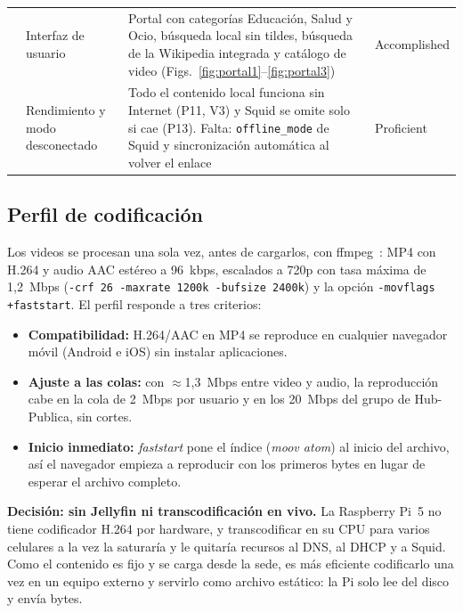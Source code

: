 \documentclass[conference]{IEEEtran}
\begin{document}
\begin{table}[!t]
\begin{tabularx}{\textwidth}{lP{2.5cm}YP{1.7cm}}
 & Interfaz de usuario & Portal con categorías Educación, Salud y Ocio, búsqueda local sin tildes, búsqueda de la Wikipedia integrada y catálogo de video (Figs.~\ref{fig:portal1}--\ref{fig:portal3}) & Accomplished \\
 & Rendimiento y modo desconectado & Todo el contenido local funciona sin Internet (P11, V3) y Squid se omite solo si cae (P13). Falta: \texttt{offline\_mode} de Squid y sincronización automática al volver el enlace & Proficient \\
\bottomrule
\end{tabularx}
\end{table}

\subsection{Perfil de codificación}
Los videos se procesan una sola vez, antes de cargarlos, con ffmpeg~\cite{ffmpeg}: MP4 con H.264 y audio AAC estéreo a 96~kbps, escalados a 720p con tasa máxima de 1,2~Mbps (\texttt{-crf 26 -maxrate 1200k -bufsize 2400k}) y la opción \texttt{-movflags +faststart}. El perfil responde a tres criterios:
\begin{itemize}
\item \textbf{Compatibilidad:} H.264/AAC en MP4 se reproduce en cualquier navegador móvil (Android e iOS) sin instalar aplicaciones.
\item \textbf{Ajuste a las colas:} con $\approx$1,3~Mbps entre video y audio, la reproducción cabe en la cola de 2~Mbps por usuario y en los 20~Mbps del grupo de Hub-Publica, sin cortes.
\item \textbf{Inicio inmediato:} \textit{faststart} pone el índice (\textit{moov atom}) al inicio del archivo, así el navegador empieza a reproducir con los primeros bytes en lugar de esperar el archivo completo.
\end{itemize}

\textbf{Decisión: sin Jellyfin ni transcodificación en vivo.} La Raspberry Pi~5 no tiene codificador H.264 por hardware, y transcodificar en su CPU para varios celulares a la vez la saturaría y le quitaría recursos al DNS, al DHCP y a Squid. Como el contenido es fijo y se carga desde la sede, es más eficiente codificarlo una vez en un equipo externo y servirlo como archivo estático: la Pi solo lee del disco y envía bytes.
\end{document}
